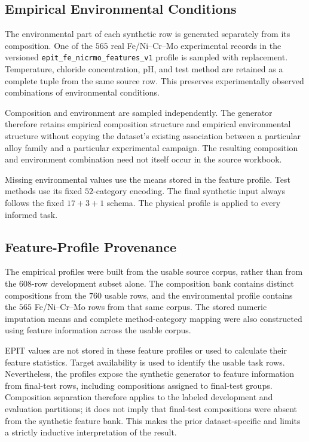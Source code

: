 \documentclass{article}
\begin{document}
\subsection{Empirical Environmental Conditions}

The environmental part of each synthetic row is generated separately from its
composition. One of the \(565\) real Fe/Ni--Cr--Mo experimental records in the
versioned \texttt{epit\_fe\_nicrmo\_features\_v1} profile is sampled with
replacement. Temperature, chloride concentration, pH, and test method are
retained as a complete tuple from the same source row. This preserves
experimentally observed combinations of environmental conditions.

Composition and environment are sampled independently. The generator therefore
retains empirical composition structure and empirical environmental structure
without copying the dataset's existing association between a particular alloy
family and a particular experimental campaign. The resulting composition and
environment combination need not itself occur in the source workbook.

Missing environmental values use the means stored in the feature profile.
Test methods use its fixed \(52\)-category encoding. The final synthetic input
always follows the fixed \(17+3+1\) schema. The physical profile is applied to
every informed task.

\subsection{Feature-Profile Provenance}
\label{sec:feature-profile-provenance}

The empirical profiles were built from the usable source corpus, rather than
from the \(608\)-row development subset alone. The composition bank contains
distinct compositions from the \(760\) usable rows, and the environmental
profile contains the \(565\) Fe/Ni--Cr--Mo rows from that same corpus. The
stored numeric imputation means and complete method-category mapping were also
constructed using feature information across the usable corpus.

EPIT values are not stored in these feature profiles or used to calculate
their feature statistics. Target availability is used to identify the usable
task rows. Nevertheless, the profiles expose the synthetic generator to
feature information from final-test rows, including compositions assigned to
final-test groups. Composition separation therefore applies to the labeled
development and evaluation partitions; it does not imply that final-test
compositions were absent from the synthetic feature bank. This makes the prior
dataset-specific and limits a strictly inductive interpretation of the result.
\end{document}
